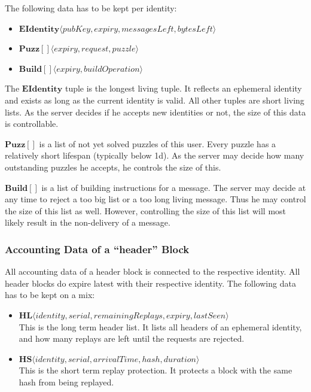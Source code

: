 The following data has to be kept per identity:
\begin{itemize}
	\item $\mathbf{EIdentity}\langle pubKey, expiry, messagesLeft, bytesLeft \rangle$
	\item $\mathbf{Puzz[]}\langle expiry, request, puzzle \rangle$
	\item $\mathbf{Build[]}\langle expiry, buildOperation \rangle$
\end{itemize}

The $\mathbf{EIdentity}$ tuple is the longest living tuple. It reflects an ephemeral identity and exists as long as the current identity is valid. All other tuples are short living lists. As the server decides if he accepts new identities or not, the size of this data is controllable.

$\mathbf{Puzz[]}$ is a list of not yet solved puzzles of this user. Every puzzle has a relatively short lifespan (typically below 1d). As the server may decide how many outstanding puzzles he accepts, he controls the size of this.

$\mathbf{Build[]}$ is a list of building instructions for a message. The server may decide at any time to reject a too big list or a too long living message. Thus he may control the size of this list as well. However, controlling the size of this list will most likely result in the non-delivery of a message.

\subsubsection{Accounting Data of a ``header'' Block}
All accounting data of a header block is connected to the respective identity. All header blocks do expire latest with their respective identity. The following data has to be kept on a mix:
\begin{itemize}
	\item $\mathbf{HL}\langle identity, serial, remainingReplays, expiry, lastSeen \rangle$\\
	This is the long term header list. It lists all headers of an ephemeral identity, and how many replays are left until the requests are rejected.
	\item $\mathbf{HS}\langle identity, serial, arrivalTime, hash, duration \rangle$\\
	This is the short term replay protection. It protects a block with the same hash from being replayed.
\end{itemize}

